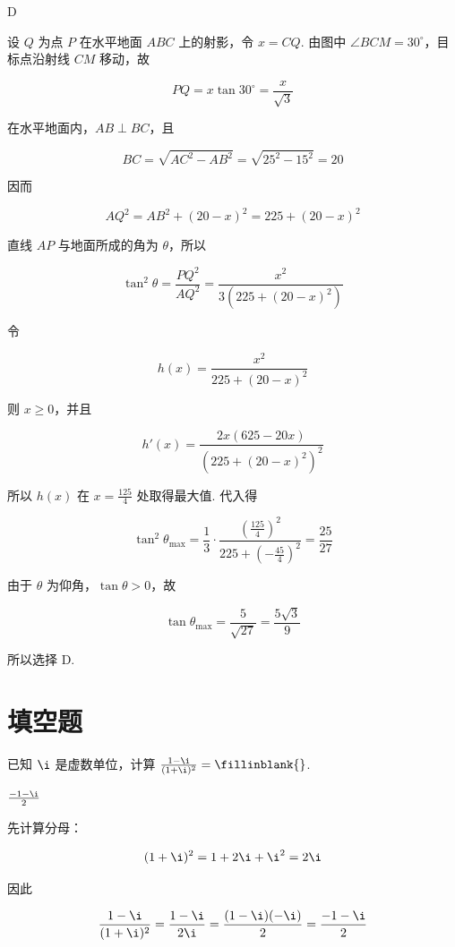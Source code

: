 \begin{answer}
D
\end{answer}

\begin{solution}
设 \(Q\) 为点 \(P\) 在水平地面 \(ABC\) 上的射影，令 \(x=CQ\). 由图中 \(\angle BCM=30^{\circ}\)，目标点沿射线 \(CM\) 移动，故

\[
PQ=x\tan30^{\circ}=\frac{x}{\sqrt{3}}
\]

在水平地面内，\(AB\perp BC\)，且

\[
BC=\sqrt{AC^{2}-AB^{2}}=\sqrt{25^{2}-15^{2}}=20
\]

因而

\[
AQ^{2}=AB^{2}+(20-x)^{2}=225+(20-x)^{2}
\]

直线 \(AP\) 与地面所成的角为 \(\theta\)，所以

\[
\tan^{2}\theta=\frac{PQ^{2}}{AQ^{2}}=\frac{x^{2}}{3\left(225+(20-x)^{2}\right)}
\]

令

\[
h(x)=\frac{x^{2}}{225+(20-x)^{2}}
\]

则 \(x\geqslant0\)，并且

\[
h'(x)=\frac{2x(625-20x)}{\left(225+(20-x)^{2}\right)^{2}}
\]

所以 \(h(x)\) 在 \(x=\frac{125}{4}\) 处取得最大值. 代入得

\[
\tan^{2}\theta_{\max}=\frac{1}{3}\cdot\frac{(\frac{125}{4})^{2}}{225+(-\frac{45}{4})^{2}}=\frac{25}{27}
\]

由于 \(\theta\) 为仰角，\(\tan\theta>0\)，故

\[
\tan\theta_{\max}=\frac{5}{\sqrt{27}}=\frac{5\sqrt{3}}{9}
\]

所以选择 D.
\end{solution}

\section{填空题}

\begin{problem}
已知 \(\i\) 是虚数单位，计算 \( \frac{1-\i}{(1+\i)^{2}} =\fillinblank{} \).
\end{problem}

\begin{answer}
\(\frac{-1-\i}{2}\)
\end{answer}

\begin{solution}
先计算分母：

\[
(1+\i)^{2}=1+2\i+\i^{2}=2\i
\]

因此

\[
\frac{1-\i}{(1+\i)^{2}}=\frac{1-\i}{2\i}=\frac{(1-\i)(-\i)}{2}=\frac{-1-\i}{2}
\]
\end{solution}

